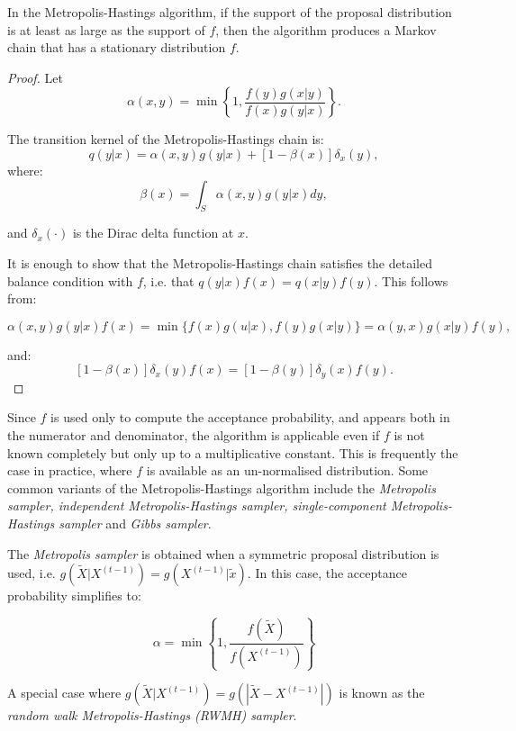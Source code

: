 \begin{prop}
In the Metropolis-Hastings algorithm, if the support of the proposal distribution is at least as large as the support of $f$, then the algorithm produces a Markov chain that has a stationary distribution $f$.

\begin{proof}
Let
$$\alpha(x,y)=\min\left\{ 1,\frac{f(y)g(x|y)}{f(x)g(y|x)}\right\}.$$

The transition kernel of the Metropolis-Hastings chain is:
\begin{equation}
q(y|x)=\alpha(x,y)g(y|x)+[1-\beta(x)]\delta_x(y),
\end{equation}
where:
\begin{equation}
\beta(x)=\int_S\alpha(x,y)g(y|x)dy,
\end{equation}

and $\delta_x(\cdotp)$ is the Dirac delta function at $x$.

It is enough to show that the Metropolis-Hastings chain satisfies the detailed balance condition with $f$, i.e. that $q(y|x)f(x)=q(x|y)f(y)$. This follows from:

$$\alpha(x,y)g(y|x)f(x)=\min\{f(x)g(u|x),f(y)g(x|y)\}=\alpha(y,x)g(x|y)f(y),$$

and:
$$[1-\beta(x)]\delta_x(y)f(x)=[1-\beta(y)]\delta_y(x)f(y).$$
\end{proof}
\end{prop}

Since $f$ is used only to compute the acceptance probability, and appears both in the numerator and denominator, the algorithm is applicable even if $f$ is not known completely but only up to a multiplicative constant. This is frequently the case in practice, where $f$ is available as an un-normalised distribution. Some common variants of the Metropolis-Hastings algorithm include the {\it Metropolis sampler, independent Metropolis-Hastings sampler, single-component Metropolis-Hastings sampler} and {\it Gibbs sampler}.

The {\it Metropolis sampler} is obtained when a symmetric proposal distribution is used, i.e. $g(\tilde{X}|X^{(t-1)})=g(X^{(t-1)}|\tilde{x})$. In this case, the acceptance probability simplifies to:

\begin{equation}
\alpha=\min\left\{1,\frac{f(\tilde{X})}{f(X^{(t-1)})}\right\}
\end{equation}

A special case where $g(\tilde{X}|X^{(t-1)})=g(|\tilde{X}-X^{(t-1)}|)$ is known as the {\it random walk Metropolis-Hastings (RWMH) sampler}.

